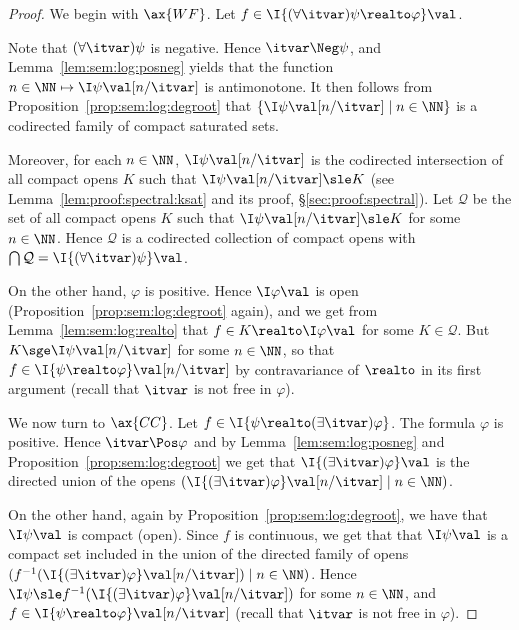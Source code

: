 \begin{proof}
We begin with $\ax{WF}$.
Let $f \in \I{(\forall \itvar)\psi \realto \varphi}\val$.

Note that $(\forall \itvar)\psi$ is negative.
Hence $\itvar \Neg \psi$,
and Lemma~\ref{lem:sem:log:posneg}
yields that the function
$n \in \NN \mapsto \I\psi\val[n / \itvar]$ is antimonotone.
It then follows from Proposition~\ref{prop:sem:log:degroot}
that $\{\I\psi\val[n / \itvar] \mid n \in \NN\}$
is a codirected family of compact saturated sets.

Moreover, for each $n \in \NN$,
$\I\psi\val[n / \itvar]$ is the codirected
intersection of all compact opens $K$
such that $\I\psi\val[n / \itvar] \sle K$
(see Lemma~\ref{lem:proof:spectral:ksat} and its proof, \S\ref{sec:proof:spectral}).
Let $\mathcal{Q}$ be the set of all compact opens $K$
such that $\I\psi\val[n / \itvar] \sle K$ for some $n \in \NN$.
Hence $\mathcal{Q}$ is a codirected collection of compact opens
with $\bigcap \mathcal{Q} = \I{(\forall \itvar)\psi}\val$.

On the other hand, $\varphi$ is positive.
Hence $\I\varphi\val$ is open (Proposition~\ref{prop:sem:log:degroot} again),
and we get from Lemma~\ref{lem:sem:log:realto}
that $f \in K \realto \I\varphi\val$
for some $K \in \mathcal{Q}$.
But $K \sge \I\psi\val[n / \itvar]$ for some $n \in \NN$,
so that $f \in \I{\psi \realto \varphi}\val[n / \itvar]$
by contravariance of $\realto$ in its first argument
(recall that $\itvar$ is not free in $\varphi$).

We now turn to $\ax{CC}$.
Let $f \in \I{\psi \realto (\exists \itvar)\varphi}$.
The formula $\varphi$ is positive.
Hence $\itvar \Pos \varphi$
and by Lemma~\ref{lem:sem:log:posneg}
and Proposition~\ref{prop:sem:log:degroot}
we get that $\I{(\exists \itvar)\varphi}\val$
is the directed union of the opens 
$(\I{(\exists \itvar)\varphi}\val[n / \itvar] \mid n \in \NN)$.

On the other hand, again by Proposition~\ref{prop:sem:log:degroot},
we have that $\I\psi\val$ is compact (open).
Since $f$ is continuous, 
we get that that $\I\psi\val$ is a compact set included in the union
of the directed family of opens
$(f^{-1}(\I{(\exists \itvar)\varphi}\val[n / \itvar]) \mid n \in \NN)$.
Hence
$\I\psi \sle f^{-1}(\I{(\exists \itvar)\varphi}\val[n / \itvar])$
for some $n \in \NN$,
and
$f \in \I{\psi \realto \varphi}\val[n / \itvar]$
(recall that $\itvar$ is not free in $\varphi$).
\end{proof}

